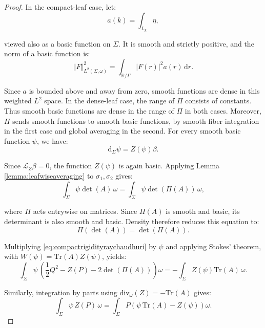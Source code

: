 \documentclass[10pt,reqno,a4paper]{amsart}
\theoremstyle{plain}
\theoremstyle{definition}
\theoremstyle{remark}
\theoremstyle{remark}
\def\dd{\mathrm{d}}
\newcommand{\Tr}{\mathrm{Tr}}
\def\cL{\mathcal{L}}
\def\cL{\mathcal{L}}
\renewcommand{\(}{ (}
\renewcommand{\)}{ )}
\begin{document}
\begin{proof}
\noindent
In the compact-leaf case, let:
\begin{equation*}
a(k)=\int_{L_k}\eta,
\end{equation*}
	
\noindent
viewed also as a basic function on $\Sigma$. It is smooth and strictly positive, and the norm of a basic function is:
\begin{equation*}
\Vert F\Vert_{L^2(\Sigma,\omega)}^2 = \int_{\mathbb{R}/\Gamma}|F(r)|^2a(r)\,\dd r.
\end{equation*}
	
\noindent
Since $a$ is bounded above and away from zero, smooth functions are dense in this weighted $L^2$ space. In the dense-leaf case, the range of $\Pi$ consists of constants. Thus smooth basic functions are dense in the range of $\Pi$ in both cases. Moreover, $\Pi$ sends smooth functions to smooth basic functions, by smooth fiber integration in the first case and global averaging in the second. For every smooth basic function $\psi$, we have:
\begin{equation*}
\dd_{\Sigma}\psi=Z(\psi)\beta.
\end{equation*}
	
\noindent
Since $\cL_Z\beta=0$, the function $Z(\psi)$ is again basic. Applying Lemma \ref{lemma:leafwiseaveraging} to $\sigma_1,\sigma_2$ gives:
\begin{equation}
\label{eq:compactrigidityaveraging}
\int_{\Sigma}\psi\det(A)\,\omega = \int_{\Sigma}\psi\det(\Pi(A))\,\omega,
\end{equation}
	
\noindent
where $\Pi$ acts entrywise on matrices. Since $\Pi(A)$ is smooth and basic, its determinant is also smooth and basic. Density therefore reduces this equation to:
\begin{equation*}
\Pi(\det(A))=\det(\Pi(A)).
\end{equation*}
	
\noindent
Multiplying \eqref{eq:compactrigidityraychaudhuri} by $\psi$ and applying Stokes' theorem, with $W(\psi)=\Tr(A)Z(\psi)$, yields:
\begin{equation}
\label{eq:compactrigidityintegrated}
\int_{\Sigma}\psi\, ( \frac{1}{2}Q^2-Z(P)-2\det(\Pi(A)) )\omega
= -\int_{\Sigma}Z(\psi)\Tr(A)\,\omega.
\end{equation}
	
\noindent
Similarly, integration by parts using $\mathrm{div}_{\omega}(Z)=-\Tr(A)$ gives:
\begin{equation*}
\int_{\Sigma}\psi\, Z(P)\,\omega = \int_{\Sigma}P (\psi\,\Tr(A)-Z(\psi) )\omega.
\end{equation*}
	

\end{proof}
\end{document}
